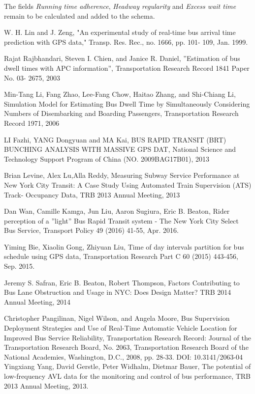 \documentclass[12pt]{report}
\begin{document}
\vspace{1cm}

The fields \textit{Running time adherence}, \textit{Headway regularity} and \textit{Excess wait time} remain to be calculated and added to the schema.

\begin{thebibliography}{9}

W. H. Lin and J. Zeng, "An experimental study of real-time bus arrival time prediction with GPS data," Transp. Res. Rec., no. 1666, pp. 101- 109, Jan. 1999.

Rajat Rajbhandari, Steven I. Chien, and Janice R. Daniel, ''Estimation of bus dwell times with APC information'', Transportation Research Record 1841 Paper No. 03- 2675, 2003

Min-Tang Li, Fang Zhao, Lee-Fang Chow, Haitao Zhang, and Shi-Chiang Li, Simulation Model for Estimating Bus Dwell Time by Simultaneously Considering Numbers of Disembarking and
Boarding Passengers, Transportation Research Record 1971, 2006

LI Fazhi, YANG Dongyuan and MA Kai, BUS RAPID TRANSIT (BRT) BUNCHING ANALYSIS WITH MASSIVE GPS DAT, National Science and Technology Support Program of China (NO. 2009BAG17B01), 2013

Brian Levine, Alex Lu,Alla Reddy, Measuring Subway Service Performance at New York City Transit: A Case Study Using Automated Train Supervision (ATS) Track- Occupancy Data, TRB 2013 Annual Meeting, 2013

Dan Wan, Camille Kamga, Jun Liu, Aaron Sugiura, Eric B. Beaton, Rider perception of a ''light'' Bus Rapid Transit system - The New York City Select Bus Service, Transport Policy 49 (2016) 41-55, Apr. 2016.

Yiming Bie, Xiaolin Gong, Zhiyuan Liu, Time of day intervals partition for bus schedule using GPS data, Transportation Research Part C 60 (2015) 443-456, Sep. 2015.

Jeremy S. Safran, Eric B. Beaton, Robert Thompson, Factors Contributing to Bus Lane Obstruction and Usage in NYC: Does Design Matter? TRB 2014 Annual Meeting, 2014
 
Christopher Pangilinan, Nigel Wilson, and Angela Moore, Bus Supervision Deployment Strategies and Use of Real-Time Automatic
Vehicle Location for Improved
Bus Service Reliability, Transportation Research Record: Journal of the Transportation Research Board, No. 2063, Transportation Research Board of the National Academies, Washington, D.C., 2008, pp. 28-33.
DOI: 10.3141/2063-04
Yingxiang Yang, David Gerstle, Peter Widhalm, Dietmar Bauer, The potential of low-frequency AVL data for the monitoring and control of bus performance, TRB 2013 Annual Meeting, 2013.


\end{thebibliography}
\end{document}
